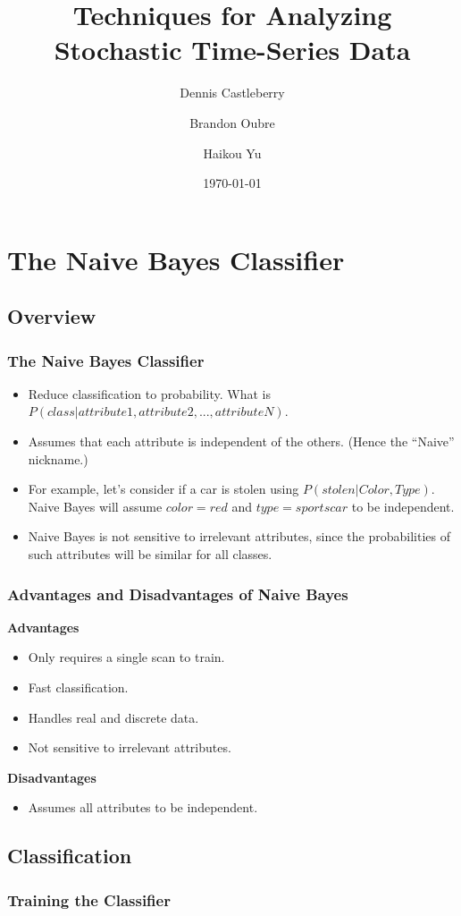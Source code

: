 \documentclass[mathserif]{beamer}
\begin{document}
	\title[Analyzing Stochastic Time-Series Data]{Techniques for Analyzing Stochastic Time-Series Data}
	\author[Castleberry \and Oubre \and Yu]{Dennis Castleberry \and Brandon Oubre \and Haikou Yu}
	\date{\today}
	\frame{\titlepage}
	
	\section{The Naive Bayes Classifier}
	\subsection{Overview}
	\begin{frame}
		\frametitle{The Naive Bayes Classifier}
		\begin{itemize}
			\item Reduce classification to probability. What is \(P(class | attribute1, attribute2, ..., attributeN)\).
			\item Assumes that each attribute is independent of the others. (Hence the ``Naive'' nickname.)
			\item For example, let's consider if a car is stolen using \(P(stolen | Color, Type)\). Naive Bayes will assume \(color=red\) and \(type=sportscar\) to be independent.
			\item Naive Bayes is not sensitive to irrelevant attributes, since the probabilities of such attributes will be similar for all classes.
		\end{itemize}
	\end{frame}
	
	\begin{frame}
		\frametitle{Advantages and Disadvantages of Naive Bayes}
		\textbf{Advantages}
		\begin{itemize}
			\item Only requires a single scan to train.
			\item Fast classification.
			\item Handles real and discrete data.
			\item Not sensitive to irrelevant attributes.
		\end{itemize}
		\textbf{Disadvantages}
		\begin{itemize}
			\item Assumes all attributes to be independent.
		\end{itemize}
	\end{frame}
	
	\subsection{Classification}
	\begin{frame}
		\frametitle{Training the Classifier}
	\end{frame}
		
\end{document}
